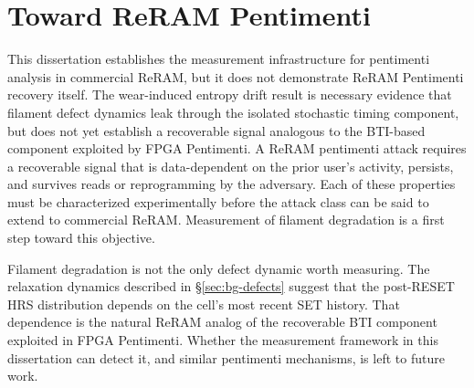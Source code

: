 \section{Toward ReRAM Pentimenti}
This dissertation establishes the measurement infrastructure for
pentimenti analysis in commercial ReRAM, but it does not demonstrate
ReRAM Pentimenti recovery itself. The wear-induced entropy drift result
is necessary evidence that filament defect dynamics leak through the
isolated stochastic timing component, but does not yet establish a
recoverable signal analogous to the BTI-based component exploited by
FPGA Pentimenti. A ReRAM pentimenti attack requires a recoverable signal
that is data-dependent on the prior user's activity, persists, and
survives reads or reprogramming by the adversary. Each of these
properties must be characterized experimentally before the attack class
can be said to extend to commercial ReRAM. Measurement of filament
degradation is a first step toward this objective.

Filament degradation is not the only defect dynamic worth measuring. The
relaxation dynamics described in \S\ref{sec:bg-defects} suggest that the
post-RESET HRS distribution depends on the cell's most recent SET
history. That dependence is the natural ReRAM analog of the recoverable
BTI component exploited in FPGA Pentimenti. Whether the measurement
framework in this dissertation can detect it, and similar pentimenti
mechanisms, is left to future work.